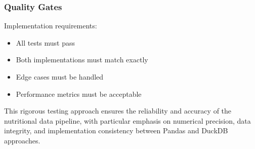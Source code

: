 \subsubsection{Quality Gates}
Implementation requirements:
\begin{itemize}
    \item All tests must pass
    \item Both implementations must match exactly
    \item Edge cases must be handled
    \item Performance metrics must be acceptable
\end{itemize}

This rigorous testing approach ensures the reliability and accuracy of the nutritional data pipeline, with particular emphasis on numerical precision, data integrity, and implementation consistency between Pandas and DuckDB approaches.

